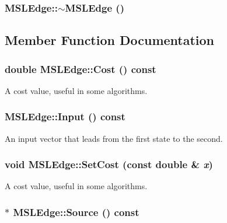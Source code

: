 \subsubsection{\setlength{\rightskip}{0pt plus 5cm}MSLEdge::$\sim$MSLEdge ()\hspace{0.3cm}{\tt  [inline]}}\label{classMSLEdge_a4}




\subsection{Member Function Documentation}
\subsubsection{\setlength{\rightskip}{0pt plus 5cm}double MSLEdge::Cost () const\hspace{0.3cm}{\tt  [inline]}}\label{classMSLEdge_a6}


A cost value, useful in some algorithms.

\subsubsection{ MSLEdge::Input () const\hspace{0.3cm}{\tt  [inline]}}\label{classMSLEdge_a8}


An input vector that leads from the first state to the second.

\subsubsection{\setlength{\rightskip}{0pt plus 5cm}void MSLEdge::Set\-Cost (const double \& {\em x})\hspace{0.3cm}{\tt  [inline]}}\label{classMSLEdge_a7}


A cost value, useful in some algorithms.

\subsubsection{$\ast$ MSLEdge::Source () const\hspace{0.3cm}{\tt  [inline]}}\label{classMSLEdge_a9}


